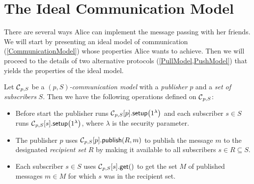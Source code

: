%
%
\section{The Ideal Communication Model}\label{IdealCommunication}

There are several ways Alice can implement the message passing with her 
friends.
We will start by presenting an ideal model of communication 
(\cref{CommunicationModel}) whose properties Alice wants to achieve.
Then we will proceed to the details of two alternative protocols 
(\cref{PullModel,PushModel}) that yields the properties of the ideal model.

\begin{definition}\label{CommunicationModel}
  Let \(\C[p, S]\) be a \emph{\((p, S)\)-communication model} with 
  a \emph{publisher} \(p\) and a \emph{set of subscribers} \(S\).
  Then we have the following operations defined on \(\C[p, S]\):
  \begin{itemize}
    \item Before start the publisher runs \(\csetup[p, S]{p}[1^\lambda]\) and 
      each subscriber \(s\in S\) runs \(\csetup[p, S]{s}[1^\lambda]\), where 
      \(\lambda\) is the security parameter.
    \item The publisher \(p\) uses \(\cpub[p, S]{p}[R][m]\) to publish the 
      message \(m\) to the designated \emph{recipient set} \(R\) by making it 
      available to all subscribers \(s\in R\subseteq S\).
    \item Each subscriber \(s\in S\) uses \(\cget[p, S]{s}[]\) to get the set 
      \(M\) of published messages \(m\in M\) for which \(s\) was in the 
      recipient set.
  \end{itemize}
\end{definition}

